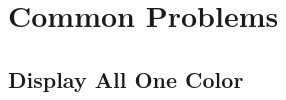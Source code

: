 \documentclass[twoside,10pt]{book}
\begin{document}


	








\chapter{Common Problems}
\label{ch:commonprobs}


\section{Display All One Color}
\label{sec:OneColorDisplay}
\end{document}
